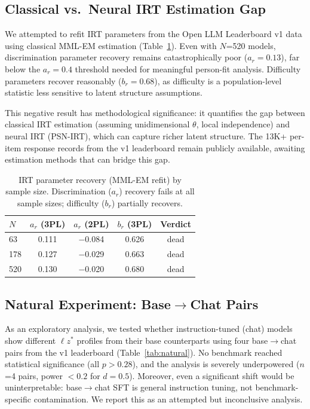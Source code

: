 \documentclass[11pt,a4paper]{article}
\newcommand{\lzstar}{\ensuremath{\ell z^*}}
\begin{document}
\subsection{Classical vs.\ Neural IRT Estimation Gap}

We attempted to refit IRT parameters from the Open LLM Leaderboard v1 data using classical MML-EM estimation (Table~\ref{tab:refit}).
Even with $N$=520 models, discrimination parameter recovery remains catastrophically poor ($a_r = 0.13$), far below the $a_r = 0.4$ threshold needed for meaningful person-fit analysis.
Difficulty parameters recover reasonably ($b_r = 0.68$), as difficulty is a population-level statistic less sensitive to latent structure assumptions.

This negative result has methodological significance: it quantifies the gap between classical IRT estimation (assuming unidimensional $\theta$, local independence) and neural IRT (PSN-IRT), which can capture richer latent structure.
The 13K+ per-item response records from the v1 leaderboard remain publicly available, awaiting estimation methods that can bridge this gap.

\begin{table}[t]
\centering
\small
\caption{IRT parameter recovery (MML-EM refit) by sample size. Discrimination ($a_r$) recovery fails at all sample sizes; difficulty ($b_r$) partially recovers.}
\label{tab:refit}
\begin{tabular}{lcccc}
\toprule
$N$ & $a_r$ (3PL) & $a_r$ (2PL) & $b_r$ (3PL) & \textbf{Verdict} \\
\midrule
63 & 0.111 & $-$0.084 & 0.626 & dead \\
178 & 0.127 & $-$0.029 & 0.663 & dead \\
520 & 0.130 & $-$0.020 & 0.680 & dead \\
\bottomrule
\end{tabular}
\end{table}

\subsection{Natural Experiment: Base$\to$Chat Pairs}

As an exploratory analysis, we tested whether instruction-tuned (chat) models show different $\lzstar$ profiles from their base counterparts using four base$\to$chat pairs from the v1 leaderboard (Table~\ref{tab:natural}).
No benchmark reached statistical significance (all $p > 0.28$), and the analysis is severely underpowered ($n$=4 pairs, power $< 0.2$ for $d=0.5$).
Moreover, even a significant shift would be uninterpretable: base$\to$chat SFT is general instruction tuning, not benchmark-specific contamination.
We report this as an attempted but inconclusive analysis.
\end{document}
